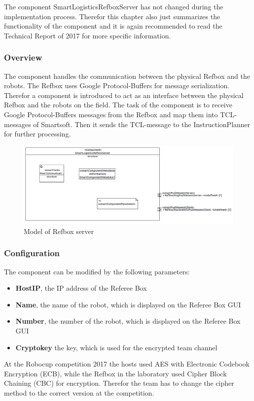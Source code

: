 The component SmartLogisticsRefboxServer has not changed during the implementation process. Therefor this chapter also just summarizes the functionality of the component and it is again recommended to read the Technical Report of 2017 for more specific information.

\subsubsection{Overview}

The component handles the communication between the physical Refbox and the robots. The Refbox uses Google Protocol-Buffers for message serialization. Therefor a component is introduced to act as an interface between the physical Refbox and the robots on the field. The task of the component is to receive Google Protocol-Buffers messages from the Refbox and map them into TCL-messages of Smartsoft. Then it sends the TCL-message to the InstructionPlanner for further processing. 

\begin{figure}[!h]
\centering
\includegraphics[width=\linewidth]{pic/component_refbox_server.png}
\caption{Model of Refbox server}
\label{fig:modelRefboxServer}
\end{figure}


\subsubsection{Configuration}

The component can be modified by the following parameters:
\begin{itemize}
\item \textbf{HostIP}, the IP address of the Referee Box
\item \textbf{Name}, the name of the robot, which is displayed on the Referee Box GUI
\item \textbf{Number}, the number of the robot, which is displayed on the Referee Box GUI
\item \textbf{Cryptokey} the key, which is used for the encrypted team channel
\end{itemize}

At the Robocup competition 2017 the hosts used AES with Electronic Codebook Encryption (ECB), while the Refbox in the laboratory used Cipher Block Chaining (CBC) for encryption. Therefor the team has to change the cipher method to the correct version at the competition.